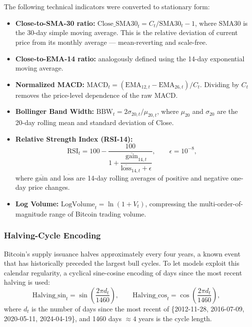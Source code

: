 \documentclass[12pt]{article}
\begin{document}
The following technical indicators were converted to stationary form:
\begin{itemize}[leftmargin=*]
    \item \textbf{Close-to-SMA-30 ratio:} $\mathrm{Close\_SMA30}_t = C_t / \mathrm{SMA30}_t - 1$, where $\mathrm{SMA30}$ is the 30-day simple moving average. This is the relative deviation of current price from its monthly average --- mean-reverting and scale-free.
    \item \textbf{Close-to-EMA-14 ratio:} analogously defined using the 14-day exponential moving average.
    \item \textbf{Normalized MACD:} $\mathrm{MACD}_t = (\mathrm{EMA}_{12,t} - \mathrm{EMA}_{26,t}) / C_t$. Dividing by $C_t$ removes the price-level dependence of the raw MACD.
    \item \textbf{Bollinger Band Width:} $\mathrm{BBW}_t = 2\sigma_{20,t} / \mu_{20,t}$, where $\mu_{20}$ and $\sigma_{20}$ are the 20-day rolling mean and standard deviation of Close.
    \item \textbf{Relative Strength Index (RSI-14):}
    \begin{equation}
        \mathrm{RSI}_t = 100 - \frac{100}{1 + \dfrac{\overline{\mathrm{gain}}_{14,t}}{\overline{\mathrm{loss}}_{14,t} + \epsilon}},\qquad \epsilon = 10^{-8},
        \label{eq:rsi}
    \end{equation}
    where $\overline{\mathrm{gain}}$ and $\overline{\mathrm{loss}}$ are 14-day rolling averages of positive and negative one-day price changes.
    \item \textbf{Log Volume:} $\mathrm{LogVolume}_t = \ln(1 + V_t)$, compressing the multi-order-of-magnitude range of Bitcoin trading volume.
\end{itemize}

\subsubsection{Halving-Cycle Encoding}

Bitcoin's supply issuance halves approximately every four years, a known event that has historically preceded the largest bull cycles. To let models exploit this calendar regularity, a cyclical sine-cosine encoding of days since the most recent halving is used:
\begin{equation}
    \mathrm{Halving\_sin}_t = \sin\!\left(\frac{2\pi d_t}{1460}\right), \qquad
    \mathrm{Halving\_cos}_t = \cos\!\left(\frac{2\pi d_t}{1460}\right),
\end{equation}
where $d_t$ is the number of days since the most recent of \{2012-11-28, 2016-07-09, 2020-05-11, 2024-04-19\}, and 1460 days $\approx 4$ years is the cycle length.
\end{document}
